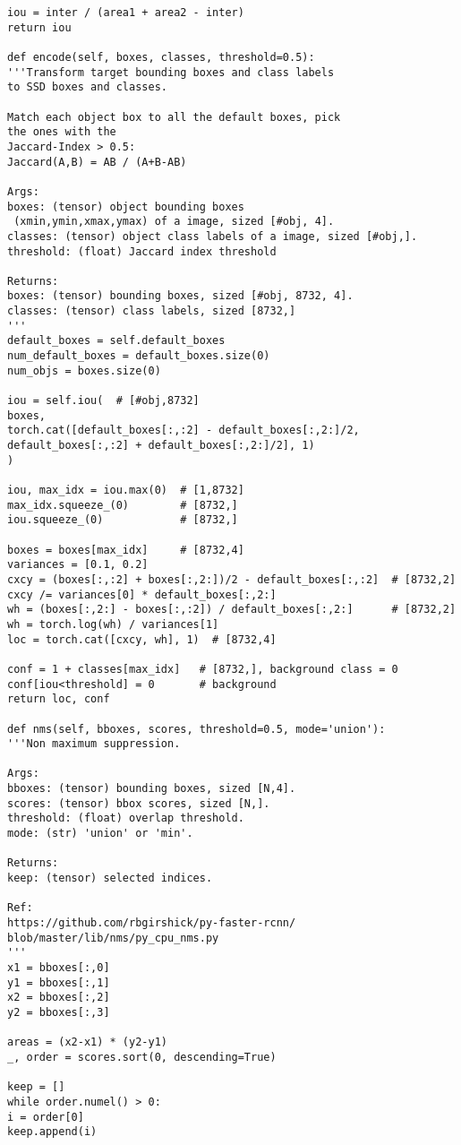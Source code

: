 \begin{lstlisting}
iou = inter / (area1 + area2 - inter)
return iou

def encode(self, boxes, classes, threshold=0.5):
'''Transform target bounding boxes and class labels 
to SSD boxes and classes.

Match each object box to all the default boxes, pick 
the ones with the
Jaccard-Index > 0.5:
Jaccard(A,B) = AB / (A+B-AB)

Args:
boxes: (tensor) object bounding boxes
 (xmin,ymin,xmax,ymax) of a image, sized [#obj, 4].
classes: (tensor) object class labels of a image, sized [#obj,].
threshold: (float) Jaccard index threshold

Returns:
boxes: (tensor) bounding boxes, sized [#obj, 8732, 4].
classes: (tensor) class labels, sized [8732,]
'''
default_boxes = self.default_boxes
num_default_boxes = default_boxes.size(0)
num_objs = boxes.size(0)

iou = self.iou(  # [#obj,8732]
boxes,
torch.cat([default_boxes[:,:2] - default_boxes[:,2:]/2,
default_boxes[:,:2] + default_boxes[:,2:]/2], 1)
)

iou, max_idx = iou.max(0)  # [1,8732]
max_idx.squeeze_(0)        # [8732,]
iou.squeeze_(0)            # [8732,]

boxes = boxes[max_idx]     # [8732,4]
variances = [0.1, 0.2]
cxcy = (boxes[:,:2] + boxes[:,2:])/2 - default_boxes[:,:2]  # [8732,2]
cxcy /= variances[0] * default_boxes[:,2:]
wh = (boxes[:,2:] - boxes[:,:2]) / default_boxes[:,2:]      # [8732,2]
wh = torch.log(wh) / variances[1]
loc = torch.cat([cxcy, wh], 1)  # [8732,4]

conf = 1 + classes[max_idx]   # [8732,], background class = 0
conf[iou<threshold] = 0       # background
return loc, conf

def nms(self, bboxes, scores, threshold=0.5, mode='union'):
'''Non maximum suppression.

Args:
bboxes: (tensor) bounding boxes, sized [N,4].
scores: (tensor) bbox scores, sized [N,].
threshold: (float) overlap threshold.
mode: (str) 'union' or 'min'.

Returns:
keep: (tensor) selected indices.

Ref:
https://github.com/rbgirshick/py-faster-rcnn/
blob/master/lib/nms/py_cpu_nms.py
'''
x1 = bboxes[:,0]
y1 = bboxes[:,1]
x2 = bboxes[:,2]
y2 = bboxes[:,3]

areas = (x2-x1) * (y2-y1)
_, order = scores.sort(0, descending=True)

keep = []
while order.numel() > 0:
i = order[0]
keep.append(i)


\end{lstlisting}
